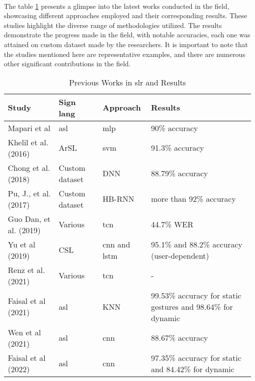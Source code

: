 \paragraph{}
The table \ref{tab:previous-works} presents a glimpse into the latest works conducted in the field, showcasing different approaches employed and their corresponding results. These studies highlight the diverse range of methodologies utilized. The results demonstrate the progress made in the field, with notable accuracies, each one was attained on custom dataset made by the researchers. It is important to note that the studies mentioned here are representative examples, and there are numerous other significant contributions in the field.
\begin{table}[h]
	\centering
	\caption{Previous Works in \ac{slr} and Results}
	\label{tab:previous-works}
	\begin{tabular}{|p{}|p{}|p{}|p{}|}
		\hline
		\textbf{Study} & \textbf{Sign lang} & \textbf{Approach} & \textbf{Results} \\
		\hline
		Mapari et al\cite{mapari2016american} & \ac{asl} & \ac{mlp} & 90\% accuracy \\
		\hline
		Khelil et al. (2016) \cite{khelil2016hand} & ArSL & \ac{svm} & 91.3\% accuracy \\
		\hline
		Chong et al. (2018) \cite{chong2018american} & Custom dataset & DNN & 88.79\% accuracy \\
		\hline
		Pu, J., et al. (2017) \cite{fang2017deepasl} & Custom dataset & HB-RNN & more than 92\% accuracy	\\
		\hline
		Guo Dan, et al. (2019) \cite{guo2019dense} & Various &  \ac{tcn} & 44.7\% WER \\
		\hline
		Yu et al (2019) \cite{yu2019exploration} & CSL & \ac{cnn} and \ac{lstm} & 95.1\% and 88.2\% accuracy (user-dependent) \\
		\hline
		Renz et al. (2021) \cite{renz2021sign} & Various & \ac{tcn} & - \\
		\hline
		Faisal et al (2021) \cite{faisal2021sensor} & \ac{asl} & KNN & 99.53\% accuracy for static gestures and 98.64\% for dynamic \\
		\hline
		Wen et al (2021) \cite{wen2021ai} & \ac{asl} &  \ac{cnn} & 88.67\% accuracy \\
		\hline
		Faisal et al (2022) \cite{ref-article} & \ac{asl} & \ac{cnn} & 97.35\% accuracy for static and 84.42\% for dynamic \\
		\hline
	\end{tabular}
\end{table}
